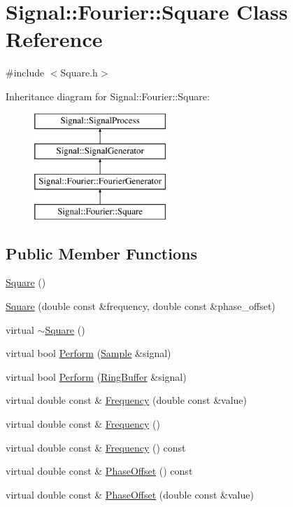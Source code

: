 \hypertarget{classSignal_1_1Fourier_1_1Square}{\section{Signal\+:\+:Fourier\+:\+:Square Class Reference}
\label{classSignal_1_1Fourier_1_1Square}
}


{\ttfamily \#include $<$Square.\+h$>$}

Inheritance diagram for Signal\+:\+:Fourier\+:\+:Square\+:\begin{figure}[H]
\begin{center}
\leavevmode
\includegraphics[height=4.000000cm]{classSignal_1_1Fourier_1_1Square}
\end{center}
\end{figure}
\subsection*{Public Member Functions}
\begin{DoxyCompactItemize}
\item 
\hyperlink{classSignal_1_1Fourier_1_1Square_ae9e86a649d8e70c793da8d69d0ac755b}{Square} ()
\item 
\hyperlink{classSignal_1_1Fourier_1_1Square_abe628eb3587a4eca934e8d449ef5ca3c}{Square} (double const \&frequency, double const \&phase\+\_\+offset)
\item 
virtual \hyperlink{classSignal_1_1Fourier_1_1Square_afc362449de1722698c8579e1f3300035}{$\sim$\+Square} ()
\item 
virtual bool \hyperlink{classSignal_1_1Fourier_1_1Square_a29e4b9d03b9df4fb6ed0d7a817ecffda}{Perform} (\hyperlink{classSignal_1_1Sample}{Sample} \&signal)
\item 
virtual bool \hyperlink{classSignal_1_1Fourier_1_1Square_a7aacafda4427b996b56ad6764ea09177}{Perform} (\hyperlink{classSignal_1_1RingBuffer}{Ring\+Buffer} \&signal)
\item 
virtual double const \& \hyperlink{classSignal_1_1Fourier_1_1Square_a99040022c5d7c9f88e52cdeeed3e797a}{Frequency} (double const \&value)
\item 
virtual double const \& \hyperlink{classSignal_1_1Fourier_1_1Square_a99816b8b028c217530551dc28e4702be}{Frequency} ()
\item 
virtual double const \& \hyperlink{classSignal_1_1SignalGenerator_a96af42ee68f94e9b04d034fd68b73ecd}{Frequency} () const 
\item 
virtual double const \& \hyperlink{classSignal_1_1SignalGenerator_ac2538ec946f001e394d2416fda698d1c}{Phase\+Offset} () const 
\item 
virtual double const \& \hyperlink{classSignal_1_1SignalGenerator_ac6a103ff72beaa338f6d18c812522d78}{Phase\+Offset} (double const \&value)
\end{DoxyCompactItemize}
